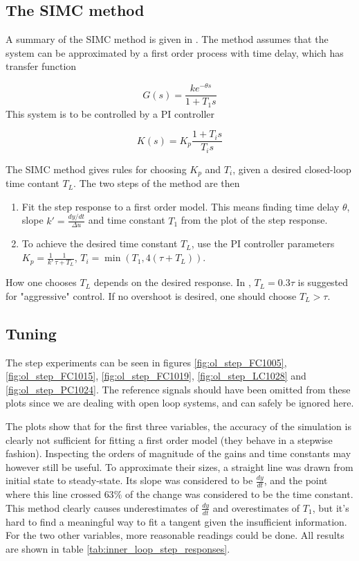 \documentclass[12pt]{article}
\begin{document}
\subsection{The SIMC method}
A summary of the SIMC method is given in \cite{regtek}. The method assumes that the system can be approximated by a first order process with time delay, which has transfer function

\begin{equation}
G(s) = \frac{k e^{-\theta s}}{1 + T_1 s}
\end{equation}
This system is to be controlled by a PI controller

\begin{equation}
K(s) = K_p\frac{1 + T_i s}{T_i s}
\end{equation}

The SIMC method gives rules for choosing $K_p$ and $T_i$, given a desired closed-loop time contant $T_L$. The two steps of the method are then

\begin{enumerate}
\item Fit the step response to a first order model. This means finding time delay $\theta$, slope $k' = \frac{dy/dt}{\Delta u}$ and time constant $T_1$ from the plot of the step response.
\item To achieve the desired time constant $T_L$, use the PI controller parameters $K_p = \frac{1}{k'} \frac{1}{\tau + T_L}$, $T_i = \min(T_1, 4(\tau + T_L))$.
\end{enumerate}
How one chooses $T_L$ depends on the desired response. In \cite{regtek}, $T_L = 0.3\tau$ is suggested for "aggressive" control. If no overshoot is desired, one should choose $T_L > \tau$.

\subsection{Tuning}
The step experiments can be seen in figures \ref{fig:ol_step_FC1005}, \ref{fig:ol_step_FC1015}, \ref{fig:ol_step_FC1019}, \ref{fig:ol_step_LC1028} and \ref{fig:ol_step_PC1024}. The reference signals should have been omitted from these plots since we are dealing with open loop systems, and can safely be ignored here.

The plots show that for the first three variables, the accuracy of the simulation is clearly not sufficient for fitting a first order model (they behave in a stepwise fashion). Inspecting the orders of magnitude of the gains and time constants may however still be useful. To approximate their sizes, a straight line was drawn from initial state to steady-state. Its slope was considered to be $\frac{dy}{dt}$, and the point where this line crossed $63\%$ of the change was considered to be the time constant. This method clearly causes underestimates of $\frac{dy}{dt}$ and overestimates of $T_1$, but it's hard to find a meaningful way to fit a tangent given the insufficient information. For the two other variables, more reasonable readings could be done. All results are shown in table \ref{tab:inner_loop_step_responses}.
\end{document}
